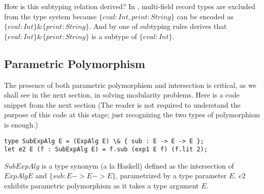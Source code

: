 How is this subtyping relation derived? In \FIend, multi-field record types are
excluded from the type system because $ \{ eval : Int, print : String \} $ can
be encoded as $ \{ eval : Int \} \& \{ print : String \} $. And by one of
subtyping rules derives that $ \{ eval : Int \} \& \{ print : String \} $ is a
subtype of $ \{ eval : Int \} $.



\subsection{Parametric Polymorphism}

The presence of both parametric polymorphism and intersection is critical, as we
shall see in the next section, in solving modularity problems. Here is a code
snippet from the next section (The reader is not required to understand the
purpose of this code at this stage; just recognizing the two types of
polymorphism is enough.)
\begin{lstlisting}
type SubExpAlg E = (ExpAlg E) \& { sub : E -> E -> E };
let e2 E (f : SubExpAlg E) = f.sub (exp1 E f) (f.lit 2);
\end{lstlisting}
$ SubExpAlg $ is a type synonym (a la Haskell) defined as the intersection of
$ ExpAlg E $ and $ \{ sub : E -> E -> E \} $, parametrized by a type parameter
$ E $. $ e2 $ exhibits parametric polymorphism as it takes a type argument
$ E $.
